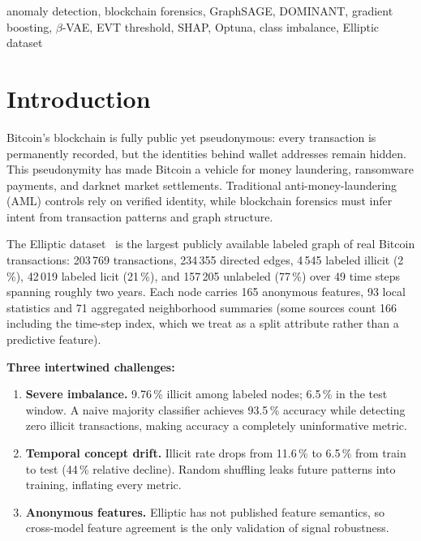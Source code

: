 \documentclass[conference]{IEEEtran}
\begin{document}
\begin{IEEEkeywords}
anomaly detection, blockchain forensics, GraphSAGE, DOMINANT, gradient boosting,
$\beta$-VAE, EVT threshold, SHAP, Optuna, class imbalance, Elliptic dataset
\end{IEEEkeywords}

\section{Introduction}

Bitcoin's blockchain is fully public yet pseudonymous: every transaction is
permanently recorded, but the identities behind wallet addresses remain hidden.
This pseudonymity has made Bitcoin a vehicle for money laundering, ransomware
payments, and darknet market settlements.  Traditional anti-money-laundering
(AML) controls rely on verified identity, while blockchain forensics must
infer intent from transaction patterns and graph structure.

The Elliptic dataset~\cite{weber2019} is the largest publicly available labeled
graph of real Bitcoin transactions: 203\,769 transactions, 234\,355 directed
edges, 4\,545 labeled illicit (2\,\%), 42\,019 labeled licit (21\,\%), and
157\,205 unlabeled (77\,\%) over 49 time steps spanning roughly two years.
Each node carries 165 anonymous features, 93 local statistics and 71 aggregated
neighborhood summaries (some sources count 166 including the time-step
index, which we treat as a split attribute rather than a predictive feature).

\noindent\textbf{Three intertwined challenges:}
\begin{enumerate}
  \item \textbf{Severe imbalance.}  9.76\,\% illicit among labeled nodes;
        6.5\,\% in the test window.  A naive majority classifier achieves
        93.5\,\% accuracy while detecting zero illicit transactions, making
        accuracy a completely uninformative metric.
  \item \textbf{Temporal concept drift.}  Illicit rate drops from 11.6\,\% to
        6.5\,\% from train to test (44\,\% relative decline).  Random shuffling
        leaks future patterns into training, inflating every metric.
  \item \textbf{Anonymous features.}  Elliptic has not published feature
        semantics, so cross-model feature agreement is the only validation of
        signal robustness.
\end{enumerate}
\end{document}

